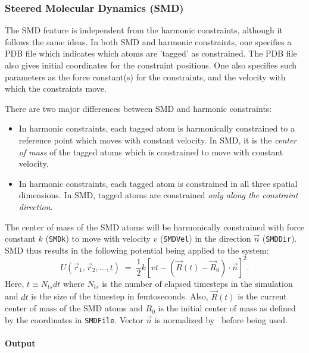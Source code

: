 \subsubsection{Steered Molecular Dynamics (SMD)}

The SMD feature is independent from the harmonic constraints, although it
follows the same ideas.  In both SMD and harmonic constraints, one specifies
a PDB file which indicates which atoms are 'tagged' as constrained.  The PDB
file also gives initial coordinates for the constraint positions.  One also
specifies such parameters as the force constant(s) for the constraints, 
and the velocity with which the constraints move.  

There are two major differences between SMD and
harmonic constraints:
\begin{itemize}
\item In harmonic constraints, each tagged atom is harmonically constrained
  to a reference point which moves with constant velocity.  In SMD, it is
  the {\em center of mass} of the tagged atoms which is constrained to move
  with constant velocity.

\item In harmonic constraints, each tagged atom is constrained in all three
  spatial dimensions.  In SMD, tagged atoms are constrained {\em only along
  the constraint direction}.
\end{itemize}

The center of mass of the SMD atoms will be harmonically constrained with 
force constant $k$ ({\tt SMDk}) to move with velocity $v$ ({\tt SMDVel}) in 
the direction $\vec n$ ({\tt SMDDir}).  SMD thus results in the following
potential being applied to the system:
\begin{equation}
\label{eq:SMDpotential}
U(\vec r_1, \vec r_2, ..., t) \; = \; \frac{1}{2} 
  k\left[vt - (\vec R(t) - \vec R_0)\cdot \vec n \right]^2.
\end{equation}
Here, $t \equiv N_{ts} dt$ where $N_{ts}$ is the number of elapsed timesteps
in the simulation and $dt$ is the size of the timestep in femtoseconds.
Also, $\vec R(t)$ is the current center of mass of the SMD atoms and $R_0$ is
the initial center of mass as defined by the coordinates in {\tt SMDFile}.
Vector $\vec n$ is normalized by \NAMD\ before being used.  

\paragraph*{Output}

